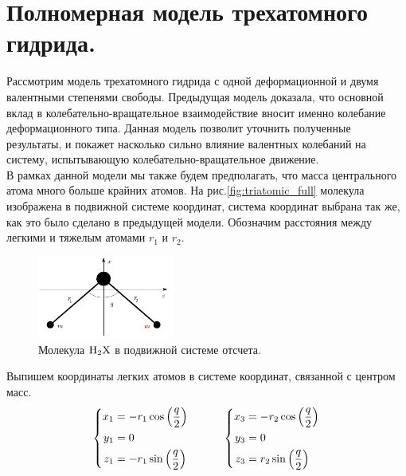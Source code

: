 \section{Полномерная модель трехатомного гидрида.}

Рассмотрим модель трехатомного гидрида с одной деформационной и двумя валентными степенями свободы. Предыдущая модель доказала, что основной вклад в колебательно-вращательное взаимодействие вносит именно колебание деформационного типа. Данная модель позволит уточнить полученные результаты, и покажет насколько сильно влияние валентных колебаний на систему, испытывающую колебательно-вращательное движение. \\
В рамках данной модели мы также будем предполагать, что масса центрального атома много больше крайних атомов. На рис.\eqref{fig:triatomic_full} молекула изображена в подвижной системе координат, система координат выбрана так же, как это было сделано в предыдущей модели. Обозначим расстояния между легкими и тяжелым атомами $r_1$ и $r_2$.

\begin{figure}[H]
  \centering
	\includegraphics[width=0.4\textwidth]{../pictures/triatomic_full.png}
	\caption{Молекула $\ce{H2X}$ в подвижной системе отсчета.}
	\label{fig:triatomic_full}
\end{figure}

Выпишем координаты легких атомов в системе координат, связанной с центром масс.
\vverh
\begin{gather}
\left\{
\begin{aligned}
x_1 &= - r_1 \cos \left( \frac{q}{2} \right) \\
y_1 &= 0 \\
z_1 &= - r_1 \sin \left( \frac{q}{2} \right) 
\end{aligned}
\right. \quad \quad \quad
\left\{
\begin{aligned}
x_3 &= - r_2 \cos \left( \frac{q}{2} \right) \\
y_3 &= 0 \\
z_3 &= r_2 \sin \left( \frac{q}{2} \right)
\end{aligned}
\right.\notag
\end{gather}

